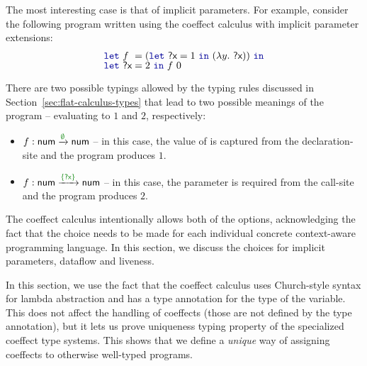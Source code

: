 The most interesting case is that of implicit parameters. For example, consider the following
program written using the coeffect calculus with implicit parameter extensions:
%
\begin{equation*}
\begin{array}{l}
\kvd{let}~f~= (\kvd{let}~\ident{?x}=1~\kvd{in}~(\lambda y.~\ident{?x}))~\kvd{in} \\[-0.2em]
\kvd{let}~\ident{?x}=2~\kvd{in}~f~0 \\[-0.2em]
\end{array}
\end{equation*}

\noindent
There are two possible typings allowed by the typing rules discussed in Section~\ref{sec:flat-calculus-types}
that lead to two possible meanings of the program -- evaluating to $1$ and $2$, respectively:
%
\begin{itemize}
  \item $f : \ident{num} \xrightarrow{\cclrd{\emptyset}} \ident{num}$ -- in this case, the value
    of  is captured from the declaration-site and the program produces $1$.
  \item $f : \ident{num} \xrightarrow{\cclrd{\{ \ident{?x} \}}} \ident{num}$ -- in this case, the
    parameter  is required from the call-site and the program produces $2$.
\end{itemize}
%
The coeffect calculus intentionally allows both of the options, acknowledging the fact that the
choice needs to be made for each individual concrete context-aware programming language. In this
section, we discuss the choices for implicit parameters, dataflow and liveness.

In this section, we use the fact that the coeffect calculus uses Church-style syntax for lambda
abstraction and has a type annotation for the type of the variable. This does not affect the
handling of coeffects (those are not defined by the type annotation), but it lets us prove
uniqueness typing property of the specialized coeffect type systems. This shows that we define a
\emph{unique} way of assigning coeffects to otherwise well-typed programs.


